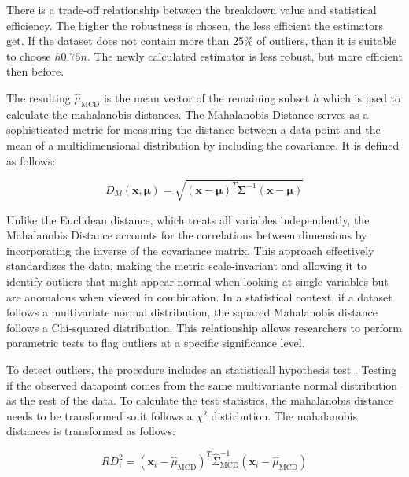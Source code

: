 There is a trade-off relationship between the breakdown value and statistical efficiency.
The higher the robustness is chosen, the less efficient the estimators get. 
If the dataset does not contain more than 25\% of outliers, than it is suitable to choose $h  0.75n$. \citep[p.217]{rousseeuw1999fast}
The newly calculated estimator is less robust, but more efficient then before. 

The resulting $\hat{\mu}_{\text{MCD}}$ is the mean vector of the remaining subset $h$ which is used to calculate the mahalanobis distances.
The Mahalanobis Distance serves as a sophisticated metric for measuring the distance between a data point and the mean of a multidimensional distribution by including the covariance. 
It is defined as follows:


\begin{equation}
    D_M(\mathbf{x}, \mathbf{\mu}) = \sqrt{ (\mathbf{x} - \mathbf{\mu})^T \mathbf{\Sigma}^{-1} (\mathbf{x} - \mathbf{\mu}) }
    \label{eq:mahalanobis}
\end{equation}


Unlike the Euclidean distance, which treats all variables independently, the Mahalanobis Distance accounts for the correlations between dimensions by incorporating the inverse of the covariance matrix. 
This approach effectively standardizes the data, making the metric scale-invariant and allowing it to identify outliers that might appear normal when looking at single variables but are anomalous when viewed in combination.
In a statistical context, if a dataset follows a multivariate normal distribution, the squared Mahalanobis distance follows a Chi-squared distribution. 
This relationship allows researchers to perform parametric tests to flag outliers at a specific significance level. 


To detect outliers, the procedure includes an statisticall hypothesis test .
Testing if the observed datapoint comes from the same multivariante normal distribution as the rest of the data.
To calculate the test statistics, the mahalanobis distance needs to be transformed so it follows a $\chi^2$ distirbution.
The mahalanobis distances is transformed as follows:

\begin{equation}
    RD_i^2 = (\mathbf{x}_i - \hat{\mu}_{\text{MCD}})^T \hat{\Sigma}_{\text{MCD}}^{-1} (\mathbf{x}_i - \hat{\mu}_{\text{MCD}})
    \label{eq:robust_mahalanobis}
\end{equation}

